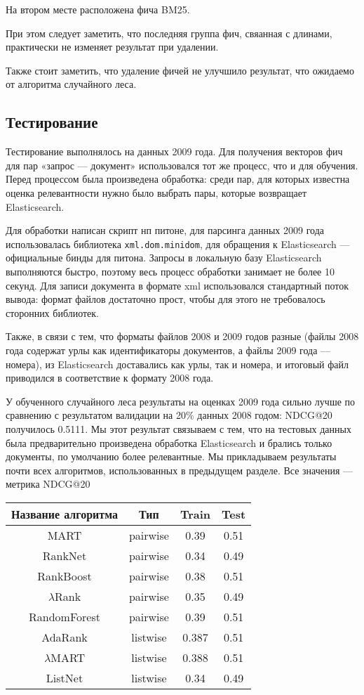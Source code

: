 На втором месте расположена фича BM25.

При этом следует заметить, что последняя группа фич, свяанная с длинами, практически не изменяет результат при удалении.

Также стоит заметить, что удаление фичей не улучшило результат, что ожидаемо от алгоритма случайного леса.

\subsection{Тестирование}

Тестирование выполнялось на данных 2009 года.
Для получения векторов фич для пар «запрос — документ» использовался тот же процесс, что и для обучения.
Перед процессом была произведена обработка: среди пар, для которых известна оценка релевантности нужно было выбрать пары, которые возвращает Elasticsearch.

Для обработки написан скрипт нп питоне, для парсинга данных 2009 года использовалась библиотека \texttt{xml.dom.minidom}, для обращения к Elasticsearch — официальные бинды для питона.
Запросы в локальную базу Elasticsearch выполняются быстро, поэтому весь процесс обработки занимает не более 10 секунд.
Для записи документа в формате xml использовался стандартный поток вывода: формат файлов достаточно прост, чтобы для этого не требовалось сторонних библиотек.

Также, в связи с тем, что форматы файлов 2008 и 2009 годов разные (файлы 2008 года содержат урлы как идентификаторы документов, а файлы 2009 года — номера), из Elasticsearch доставались как урлы, так и номера, и итоговый файл приводился в соответствие к формату 2008 года.

У обученного случайного леса результаты на оценках 2009 года сильно лучше по сравнению с результатом валидации на 20\% данных 2008 годом: NDCG@20 получилось 0.5111.
Мы этот результат связываем с тем, что на тестовых данных была предварительно произведена обработка Elasticsearch и брались только документы, по умолчанию более релевантные.
Мы прикладываем результаты почти всех алгоритмов, использованных в предыдущем разделе. Все значения — метрика NDCG@20

\begin{tabular}{|c|c|c|c|}
	\hline
	
	Название алгоритма & Тип&  Train & Test \\
	\hline
	MART & pairwise & 0.39 & 0.51\\
    RankNet & pairwise & 0.34 & 0.49\\
    RankBoost & pairwise & 0.38 & 0.51\\
    $\lambda$Rank & pairwise & 0.35 & 0.49\\
    RandomForest& pairwise & 0.39 & 0.51\\
	\hline
    AdaRank & listwise & 0.387 & 0.51\\
    $\lambda$MART & listwise & 0.388 & 0.51\\
    ListNet & listwise & 0.34 & 0.49\\
	\hline
\end{tabular}
